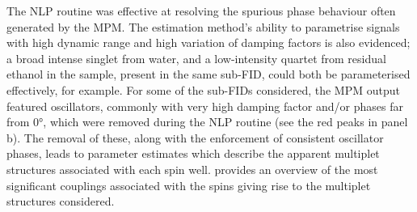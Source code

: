 The \ac{NLP} routine was effective at resolving the spurious phase behaviour
often generated by the \ac{MPM}.
The estimation method's ability to parametrise signals with high
dynamic range and high variation of damping factors is also evidenced;
a broad intense singlet from water, and a low-intensity quartet from
residual ethanol in the sample, present in the same sub-\ac{FID}, could both be
parameterised effectively, for example.
For some of the sub-\acp{FID} considered, the \ac{MPM} output featured
oscillators, commonly with very high damping factor and/or phases far from
\ang{0}, which were removed during the \ac{NLP} routine (see the red
peaks in panel b). The removal of these, along with the enforcement
of consistent oscillator phases, leads to parameter
estimates which describe the apparent multiplet structures associated with each
spin well.  provides an overview of the
most significant couplings associated with the spins giving rise to the
multiplet structures considered.
